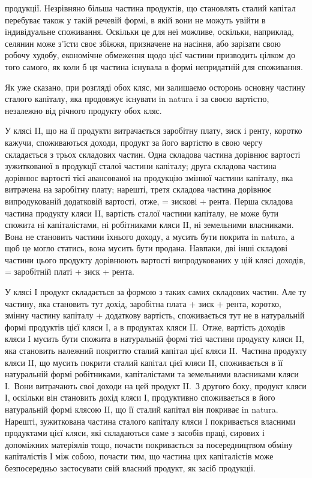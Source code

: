 \parcont{}  %
продукції. Незрівняно більша частина продуктів, що становлять сталий капітал
перебуває також у такій речевій формі, в якій вони не можуть увійти
в індивідуальне споживання. Оскільки це для неї можливе, оскільки, наприклад,
селянин може з’їсти своє збіжжя, призначене на насіння, або зарізати свою робочу
худобу, економічне обмеження щодо цієї частини призводить цілком до того
самого, як коли б ця частина існувала в формі непридатній для споживання.

Як уже сказано, при розгляді обох кляс, ми залишаємо осторонь основну
частину сталого капіталу, яка продовжує існувати in natura і за своєю вартістю,
незалежно від річного продукту обох кляс.

У клясі II, що на її продукти витрачається заробітну плату, зиск і ренту,
коротко кажучи, споживаються доходи, продукт за його вартістю в свою чергу
складається з трьох складових частин. Одна складова частина дорівнює вартості
зужиткованої в продукції сталої частини капіталу; друга складова частина дорівнює
вартості тієї авансованої на продукцію змінної частини капіталу, яка
витрачена на заробітну плату; нарешті, третя складова частина дорівнює випродукованій додатковій
вартості, отже, = зискові + рента. Перша складова частина
продукту кляси II, вартість сталої частини капіталу, не може бути спожита
ні капіталістами, ні робітниками кляси II, ні земельними власниками. Вона не
становить частини їхнього доходу, а мусить бути покрита in natura, а щоб це
могло статись, вона мусить бути продана. Навпаки, дві інші складові частини
цього продукту дорівнюють вартості випродукованих у цій клясі доходів, = заробітній
платі + зиск + рента.

У клясі І продукт складається за формою з таких самих складових частин.
Але ту частину, яка становить тут дохід, заробітна плата + зиск + рента, коротко,
змінну частину капіталу + додаткову вартість, споживається тут не
в натуральній формі продуктів цієї кляси І, а в продуктах кляси II.~Отже, вартість
доходів кляси І мусить бути спожита в натуральній формі тієї частини
продукту кляси II, яка становить належний покриттю сталий капітал цієї
кляси II.~Частина продукту кляси II, що мусить покрити сталий капітал цієї
кляси II, споживається в її натуральній формі робітниками, капіталістами та
земельними власниками кляси І.~Вони витрачають свої доходи на цей продукт II.~З другого боку, продукт кляси І, оскільки він становить дохід кляси І, продуктивно
споживається в його натуральній формі клясою II, що її сталий капітал
він покриває in natura. Нарешті, зужиткована частина сталого капіталу кляси
І покривається власними продуктами цієї кляси, які складаються саме з засобів
праці, сирових і допоміжних матеріялів тощо, почасти покривається за посередництвом
обміну капіталістів І між собою, почасти тим, що частина цих капіталістів
може безпосередньо застосувати свій власний продукт, як засіб продукції.


